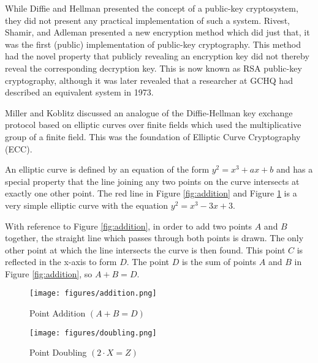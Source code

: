 \documentclass[12pt,a4paper]{article}
\begin{document}
While Diffie and Hellman presented the concept of a public-key cryptosystem, they did not present any practical implementation of such a system. 
Rivest, Shamir, and Adleman \citeyear{10.1145/359340.359342} presented a new encryption method which did just that, 
it was the first (public) implementation of public-key cryptography. 
This method had the novel property that publicly revealing an encryption key did not thereby reveal the corresponding decryption key. 
This is now known as RSA public-key cryptography, 
although it was later revealed that a researcher at GCHQ had described an equivalent system in 1973. 

Miller \citeyear{10.1007/3-540-39799-X_31} and Koblitz \citeyear{koblitz1987elliptic} discussed an analogue of the 
Diffie-Hellman key exchange protocol based on elliptic curves over finite fields which used the multiplicative group of a finite field. 
This was the foundation of Elliptic Curve Cryptography (ECC). 

An elliptic curve is defined by an equation of the form $y^2 = x^3 + ax + b$ 
and has a special property that the line joining any two points on the curve intersects at exactly one other point. 
The red line in Figure \ref{fig:addition} and Figure \ref{fig:doubling} is a very simple elliptic curve with the equation $y^2 = x^3 - 3x + 3$. 

With reference to Figure \ref{fig:addition}, in order to add two points $A$ and $B$ together, 
the straight line which passes through both points is drawn. 
The only other point at which the line intersects the curve is then found. 
This point $C$ is reflected in the x-axis to form $D$. 
The point $D$ is the sum of points $A$ and $B$ in Figure \ref{fig:addition}, so $A + B = D$. 

\begin{figure}[!htb]
    \begin{minipage}{0.48\textwidth}
        \centering
        \texttt{[image: figures/addition.png]}
        \caption{Point Addition $(A + B = D)$}
        \label{fig:addition}
    \end{minipage}\hfill
    \begin{minipage}{0.48\textwidth}
        \centering
        \texttt{[image: figures/doubling.png]}
        \caption{Point Doubling $(2 \cdot X = Z)$}
        \label{fig:doubling}
    \end{minipage}
\end{figure}
\end{document}

